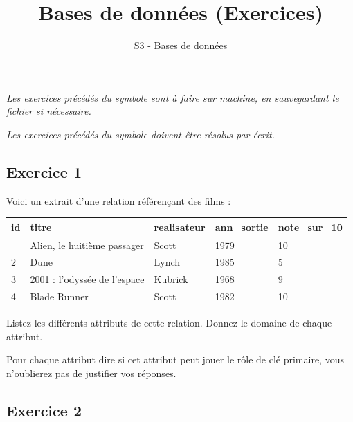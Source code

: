 \documentclass[
  letterpaper,
  DIV=11,
  numbers=noendperiod]{scrartcl}
\title{Bases de données (Exercices)}
\subtitle{S3 - Bases de données}
\author{}
\date{}
\begin{document}
\maketitle
{}  \chead{} \cfoot{}   \renewcommand{\headrulewidth}{0pt} \renewcommand{\footrulewidth}{0pt} \thispagestyle{fancy} \vspace{-3cm}

\ifdefined\Shaded\renewenvironment{Shaded}{\begin{tcolorbox}[interior hidden, enhanced, sharp corners, boxrule=0pt, borderline west={3pt}{0pt}{shadecolor}, frame hidden, breakable]}{\end{tcolorbox}}\fi

\emph{Les exercices précédés du symbole  sont à faire
sur machine, en sauvegardant le fichier si nécessaire.}

\emph{Les exercices précédés du symbole  doivent être
résolus par écrit.}

\hypertarget{fa-solid-pencil-alt-exercice-1}{%
\subsection{\texorpdfstring{ Exercice
1}{ Exercice 1}}\label{fa-solid-pencil-alt-exercice-1}}

Voici un extrait d'une relation référençant des films :

\begin{longtable}[]{@{}lllll@{}}
\toprule\noalign{}
id & titre & realisateur & ann\_sortie & note\_sur\_10 \\
\midrule\noalign{}
\endhead
\bottomrule\noalign{}
\endlastfoot
1 & Alien, le huitième passager & Scott & 1979 & 10 \\
2 & Dune & Lynch & 1985 & 5 \\
3 & 2001 : l'odyssée de l'espace & Kubrick & 1968 & 9 \\
4 & Blade Runner & Scott & 1982 & 10 \\
\end{longtable}

Listez les différents attributs de cette relation. Donnez le domaine de
chaque attribut.

Pour chaque attribut dire si cet attribut peut jouer le rôle de clé
primaire, vous n'oublierez pas de justifier vos réponses.

\hypertarget{fa-solid-pencil-alt-exercice-2}{%
\subsection{\texorpdfstring{ Exercice
2}{ Exercice 2}}\label{fa-solid-pencil-alt-exercice-2}}
\end{document}
